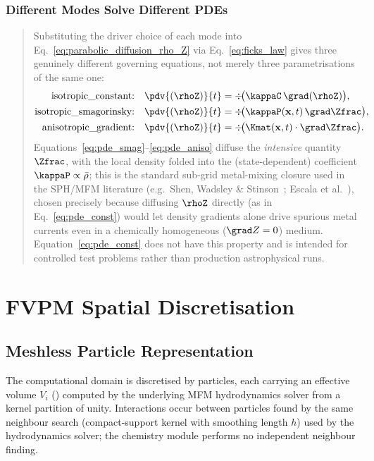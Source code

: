 \subsubsection{Different Modes Solve Different PDEs}
\label{sec:pde-per-mode}
\begin{quote}
Substituting the driver choice of each mode into
Eq.~\eqref{eq:parabolic_diffusion_rho_Z} via Eq.~\eqref{eq:ficks_law}
gives three genuinely different governing equations, not merely three
parametrisations of the same one:
\begin{align}
  \text{isotropic\_constant:} &\quad
    \pdv{(\rhoZ)}{t} = \div\!\big(\kappaC\, \grad(\rhoZ)\big) ,
    \label{eq:pde_const}\\
  \text{isotropic\_smagorinsky:} &\quad
    \pdv{(\rhoZ)}{t} = \div\!\big(\kappaP(\mathbf x,t)\, \grad \Zfrac\big) ,
    \label{eq:pde_smag}\\
  \text{anisotropic\_gradient:} &\quad
    \pdv{(\rhoZ)}{t} = \div\!\big(\Kmat(\mathbf x,t) \cdot \grad \Zfrac\big) .
    \label{eq:pde_aniso}
\end{align}
Equations~\eqref{eq:pde_smag}--\eqref{eq:pde_aniso} diffuse the
\emph{intensive} quantity $\Zfrac$, with the local density folded into
the (state-dependent) coefficient $\kappaP \propto \bar\rho$; this is the
standard sub-grid metal-mixing closure used in the SPH/MFM literature
(e.g.\ Shen, Wadsley \& Stinson~\citeyear{ShenWadsleyStinson2010}; Escala et al.~\citeyear{Escala2018}), chosen
precisely because diffusing $\rhoZ$ directly (as in
Eq.~\eqref{eq:pde_const}) would let density gradients alone drive
spurious metal currents even in a chemically homogeneous ($\grad Z = 0$)
medium. Equation~\eqref{eq:pde_const} does not have this property and is
intended for controlled test problems rather than production
astrophysical runs.
\end{quote}

\section{FVPM Spatial Discretisation}
\label{sec:fvpm-geometry}

\subsection{Meshless Particle Representation}
The computational domain is discretised by particles, each carrying an
effective volume $V_i$ () computed by the
underlying MFM hydrodynamics solver from a kernel partition of unity.
Interactions occur between particles found by the same neighbour search
(compact-support kernel with smoothing length $h$) used by the
hydrodynamics solver; the chemistry module performs no independent
neighbour finding.

